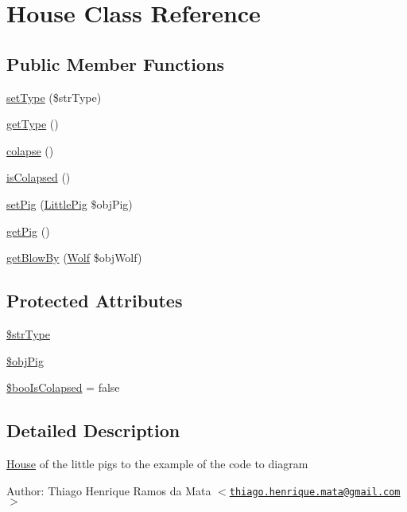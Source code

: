 \hypertarget{class_house}{
\section{House Class Reference}
\label{class_house}
}
\subsection*{Public Member Functions}
\begin{CompactItemize}
\item 
\hyperlink{class_house_48d409343c54e747174ffaf5911b2cd9}{setType} (\$strType)
\item 
\hyperlink{class_house_830b5c75df72b32396701bc563fbe3c7}{getType} ()
\item 
\hyperlink{class_house_cd0f1de87d37a838789035eaf58f17b0}{colapse} ()
\item 
\hyperlink{class_house_17f029203fb995258650c19e2616e669}{isColapsed} ()
\item 
\hyperlink{class_house_5fbf3e8f1af77b77aba13d24cd3218e0}{setPig} (\hyperlink{class_little_pig}{LittlePig} \$objPig)
\item 
\hyperlink{class_house_6b0a38021f87bca50710aba818be2809}{getPig} ()
\item 
\hyperlink{class_house_20552b3b737f2189821f0362e2bd9cee}{getBlowBy} (\hyperlink{class_wolf}{Wolf} \$objWolf)
\end{CompactItemize}
\subsection*{Protected Attributes}
\begin{CompactItemize}
\item 
\hyperlink{class_house_ac9a08cb422ab9a398d451299b054e28}{\$strType}
\item 
\hyperlink{class_house_eeadc4737b5ad49aa0a56c7bbbafdffe}{\$objPig}
\item 
\hyperlink{class_house_2eaf201bec0ce5594be8a5eb8e71b5b9}{\$booIsColapsed} = false
\end{CompactItemize}


\subsection{Detailed Description}
\hyperlink{class_house}{House} of the little pigs to the example of the code to diagram

\begin{Desc}
\item[Author:]Thiago Henrique Ramos da Mata $<$\href{mailto:thiago.henrique.mata@gmail.com}{\tt thiago.henrique.mata@gmail.com}$>$ \end{Desc}


